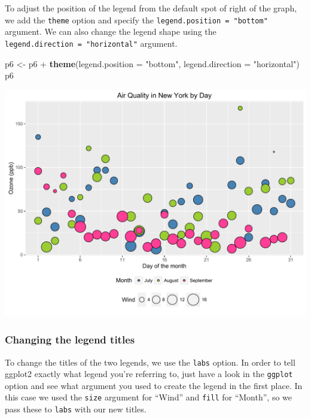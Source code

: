 \documentclass[]{article}
\newenvironment{Shaded}{\begin{snugshade}}{\end{snugshade}}
\newcommand{\KeywordTok}[1]{\textcolor[rgb]{0.13,0.29,0.53}{\textbf{{#1}}}}
\newcommand{\DataTypeTok}[1]{\textcolor[rgb]{0.13,0.29,0.53}{{#1}}}
\newcommand{\StringTok}[1]{\textcolor[rgb]{0.31,0.60,0.02}{{#1}}}
\newcommand{\NormalTok}[1]{{#1}}
\begin{document}
To adjust the position of the legend from the default spot of right of
the graph, we add the \texttt{theme} option and specify the
\texttt{legend.position\ =\ "bottom"} argument. We can also change the
legend shape using the \texttt{legend.direction\ =\ "horizontal"}
argument.

\begin{Shaded}
\begin{Highlighting}[]
\NormalTok{p6 <-}\StringTok{ }\NormalTok{p6 +}\StringTok{ }\KeywordTok{theme}\NormalTok{(}\DataTypeTok{legend.position =} \StringTok{"bottom"}\NormalTok{, }\DataTypeTok{legend.direction =} \StringTok{"horizontal"}\NormalTok{)}
\NormalTok{p6}
\end{Highlighting}
\end{Shaded}

\begin{center}\includegraphics{0_all_posts_pdf/wscatter_14-1} \end{center}

\subsubsection{Changing the legend
titles}\label{changing-the-legend-titles}

To change the titles of the two legends, we use the \texttt{labs}
option. In order to tell ggplot2 exactly what legend you're referring
to, just have a look in the \texttt{ggplot} option and see what argument
you used to create the legend in the first place. In this case we used
the \texttt{size} argument for ``Wind'' and \texttt{fill} for ``Month'',
so we pass these to \texttt{labs} with our new titles.
\end{document}
